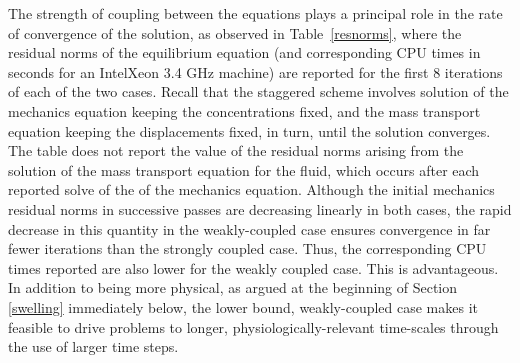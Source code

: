 The strength of coupling between the equations plays a principal role
in the rate of convergence of the solution, as observed in
Table~\ref{resnorms}, where the residual norms of the equilibrium
equation (and
corresponding CPU times in seconds for an Intel\textregistered Xeon
3.4 GHz machine) are reported for the first 8 iterations of each of
the two cases. Recall that the staggered scheme involves solution of
the mechanics equation 
keeping the concentrations fixed, and the mass transport equation
keeping the displacements fixed, in turn, until the solution
converges. The table does not report the value of the residual norms
arising from the solution of the mass transport equation for the
fluid, which occurs after each reported solve of the of the mechanics
equation. Although the initial mechanics residual norms in successive
passes are decreasing linearly in both cases, the rapid decrease in
this quantity in
the weakly-coupled case ensures convergence in far fewer iterations
than the strongly coupled case. Thus, the corresponding CPU times
reported are also lower for the weakly coupled case. This is
advantageous. In addition to being more physical, as argued at
the beginning of Section \ref{swelling} immediately below, the lower
bound, weakly-coupled case makes it feasible to drive 
problems to longer, physiologically-relevant time-scales through the use
of larger time steps.

